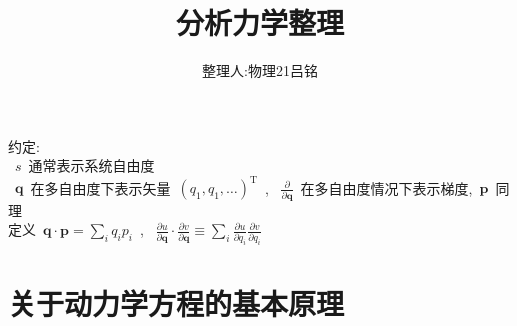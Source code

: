 \documentclass[11pt,a4paper]{article}%
\renewcommand{\[}{~$\displaystyle}
\renewcommand{\]}{$~}%
\begin{document}
\title{分析力学整理}
\author{整理人:\quad 物理21\quad 吕铭}
\maketitle
约定: \\
\[s\]通常表示系统自由度 \\
\[\bm q\]在多自由度下表示矢量\[(q_1,q_1,\dots)^{\mathrm T}\], \[\frac{\partial }{\partial \bm q}\]在多自由度情况下表示梯度,\[\bm p\]同理 \\
定义\[\bm q \cdot \bm p = \sum_i q_ip_i\], \[\frac{\partial u}{\partial \bm q}\cdot\frac{\partial v}{\partial \bm q} \equiv \sum_i\frac{\partial u}{\partial q_i}\frac{\partial v}{\partial q_i}\]
\section{关于动力学方程的基本原理}
\end{document}
